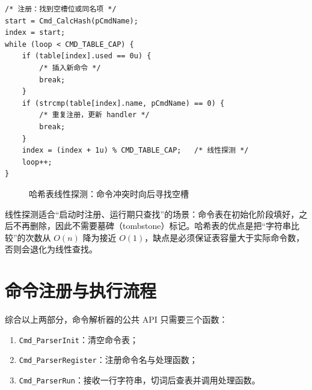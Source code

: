 \begin{lstlisting}[style=c]
/* 注册：找到空槽位或同名项 */
start = Cmd_CalcHash(pCmdName);
index = start;
while (loop < CMD_TABLE_CAP) {
    if (table[index].used == 0u) {
        /* 插入新命令 */
        break;
    }
    if (strcmp(table[index].name, pCmdName) == 0) {
        /* 重复注册，更新 handler */
        break;
    }
    index = (index + 1u) % CMD_TABLE_CAP;   /* 线性探测 */
    loop++;
}
\end{lstlisting}

\begin{figure}[htbp]
\centering
\caption{哈希表线性探测：命令冲突时向后寻找空槽} \label{fig:hash-linear}
\end{figure}

线性探测适合“启动时注册、运行期只查找”的场景：命令表在初始化阶段填好，之后不再删除，因此不需要墓碑（tombstone）标记。哈希表的优点是把“字符串比较”的次数从 $O(n)$ 降为接近 $O(1)$，缺点是必须保证表容量大于实际命令数，否则会退化为线性查找。

\section{命令注册与执行流程}

综合以上两部分，命令解析器的公共 API 只需要三个函数：

\begin{enumerate}
\item \texttt{Cmd\_ParserInit}：清空命令表；
\item \texttt{Cmd\_ParserRegister}：注册命令名与处理函数；
\item \texttt{Cmd\_ParserRun}：接收一行字符串，切词后查表并调用处理函数。
\end{enumerate}

